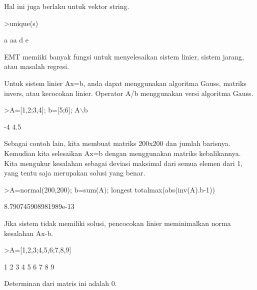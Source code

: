 \documentclass[a4paper,10pt]{article}
\begin{document}
\begin{eulernotebook}
\begin{eulercomment}
\begin{eulercomment}
\begin{eulercomment}
\begin{eulercomment}
\begin{eulercomment}
Hal ini juga berlaku untuk vektor string.
\end{eulercomment}
\begin{eulerprompt}
>unique(s)
\end{eulerprompt}
\begin{euleroutput}
  a
  aa
  d
  e
\end{euleroutput}
\begin{eulercomment}
EMT memiiki banyak fungsi untuk menyelesaikan sistem linier, sistem
jarang, atau masalah regresi. 

Untuk sistem linier Ax=b, anda dapat menggunakan algoritma Gauss,
matriks invers, atau kecocokan linier. Operator A/b menggunakan versi
algoritma Gauss.
\end{eulercomment}
\begin{eulerprompt}
>A=[1,2;3,4]; b=[5;6]; A\(\backslash\)b
\end{eulerprompt}
\begin{euleroutput}
             -4 
            4.5 
\end{euleroutput}
\begin{eulercomment}
Sebagai contoh lain, kita membuat matriks 200x200 dan jumlah barisnya.
Kemudian kita selesaikan Ax=b dengan menggunakan matriks kebalikannya.
Kita mengukur kesalahan sebagai deviasi maksimal dari semua elemen
dari 1, yang tentu saja merupakan solusi yang benar. 
\end{eulercomment}
\begin{eulerprompt}
>A=normal(200,200); b=sum(A); longest totalmax(abs(inv(A).b-1))
\end{eulerprompt}
\begin{euleroutput}
    8.790745908981989e-13 
\end{euleroutput}
\begin{eulercomment}
Jika sistem tidak memiliki solusi, pencocokan linier meminimalkan
norma kesalahan Ax-b.
\end{eulercomment}
\begin{eulerprompt}
>A=[1,2,3;4,5,6;7,8,9]
\end{eulerprompt}
\begin{euleroutput}
              1             2             3 
              4             5             6 
              7             8             9 
\end{euleroutput}
\begin{eulercomment}
Determinan dari matris ini adalah 0.
\end{eulercomment}
\begin{eulerprompt}

\end{eulerprompt}
\end{eulercomment}
\end{eulercomment}
\end{eulercomment}
\end{eulercomment}
\end{eulernotebook}
\end{document}
